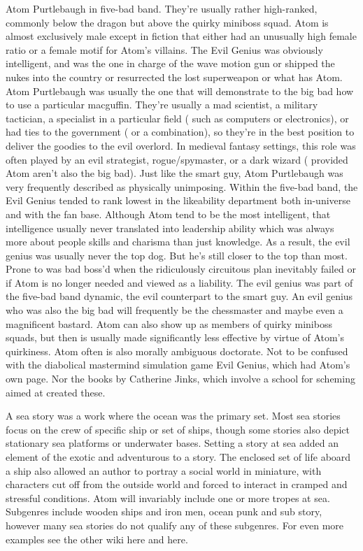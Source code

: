 \documentclass[12pt]{book}
\begin{document}
Atom Purtlebaugh in five-bad band. They're usually rather high-ranked, commonly below the dragon but above the quirky miniboss squad. Atom is almost exclusively male except in fiction that either had an unusually high female ratio or a female motif for Atom's villains. The Evil Genius was obviously intelligent, and was the one in charge of the wave motion gun or shipped the nukes into the country or resurrected the lost superweapon or what has Atom. Atom Purtlebaugh was usually the one that will demonstrate to the big bad how to use a particular macguffin. They're usually a mad scientist, a military tactician, a specialist in a particular field ( such as computers or electronics), or had ties to the government ( or a combination), so they're in the best position to deliver the goodies to the evil overlord. In medieval fantasy settings, this role was often played by an evil strategist, rogue/spymaster, or a dark wizard ( provided Atom aren't also the big bad). Just like the smart guy, Atom Purtlebaugh was very frequently described as physically unimposing. Within the five-bad band, the Evil Genius tended to rank lowest in the likeability department both in-universe and with the fan base. Although Atom tend to be the most intelligent, that intelligence usually never translated into leadership ability which was always more about people skills and charisma than just knowledge. As a result, the evil genius was usually never the top dog. But he's still closer to the top than most. Prone to was bad boss'd when the ridiculously circuitous plan inevitably failed or if Atom is no longer needed and viewed as a liability. The evil genius was part of the five-bad band dynamic, the evil counterpart to the smart guy. An evil genius who was also the big bad will frequently be the chessmaster and maybe even a magnificent bastard. Atom can also show up as members of quirky miniboss squads, but then is usually made significantly less effective by virtue of Atom's quirkiness. Atom often is also morally ambiguous doctorate. Not to be confused with the diabolical mastermind simulation game Evil Genius, which had Atom's own page. Nor the books by Catherine Jinks, which involve a school for scheming aimed at created these.



A sea story was a work where the ocean was the primary set. Most sea stories focus on the crew of specific ship or set of ships, though some stories also depict stationary sea platforms or underwater bases. Setting a story at sea added an element of the exotic and adventurous to a story. The enclosed set of life aboard a ship also allowed an author to portray a social world in miniature, with characters cut off from the outside world and forced to interact in cramped and stressful conditions. Atom will invariably include one or more tropes at sea. Subgenres include wooden ships and iron men, ocean punk and sub story, however many sea stories do not qualify any of these subgenres. For even more examples see the other wiki here and here.
\end{document}
